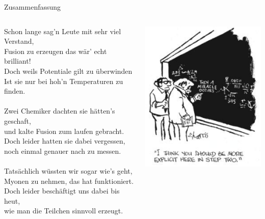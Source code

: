\begin{frame}{Zusammenfassung}
    \begin{columns}
        \begin{column}{0.6\textwidth}
            Schon lange sag'n Leute mit sehr viel Verstand, \\
            Fusion zu erzeugen das wär' echt brilliant! \\
            Doch weils Potentiale gilt zu überwinden \\
            Ist sie nur bei hoh'n Temperaturen zu finden. \\ \ \\
            Zwei Chemiker dachten sie hätten's geschaft, \\
            und kalte Fusion zum laufen gebracht. \\
            Doch leider hatten sie dabei vergessen, \\
            noch einmal genauer nach zu messen. \\ \ \\
            Tatsächlich wüssten wir sogar wie's geht, \\
            Myonen zu nehmen, das hat funktioniert. \\
            Doch leider beschäftigt uns dabei bis heut, \\
            wie man die Teilchen sinnvoll erzeugt.
        \end{column}
        \begin{column}{0.35\textwidth}
            \begin{center}
            \includegraphics[width=\textwidth]{images/5ac7f04fdd13a8f6d8bc5396e1cf5812--math-jokes-math-humor.jpeg}

\end{center}
\end{column}
\end{columns}
\end{frame}
